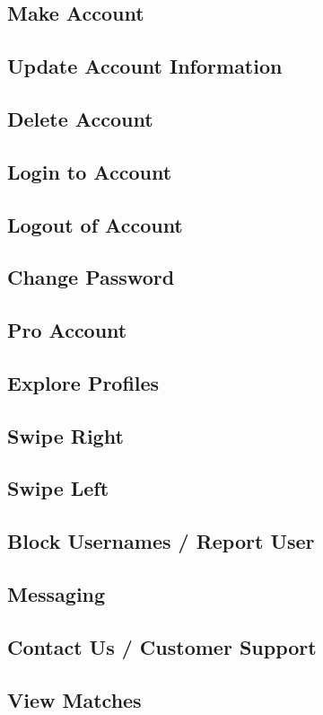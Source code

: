 \documentclass[12pt, draft]{article}
\begin{document}
\subsection{Make Account}
\subsection{Update Account Information}
\subsection{Delete Account}
\subsection{Login to Account}
\subsection{Logout of Account}
\subsection{Change Password}
\subsection{Pro Account}
\subsection{Explore Profiles}
\subsection{Swipe Right}
\subsection{Swipe Left}
\subsection{Block Usernames / Report User}
\subsection{Messaging}
\subsection{Contact Us / Customer Support}
\subsection{View Matches}
\end{document}
